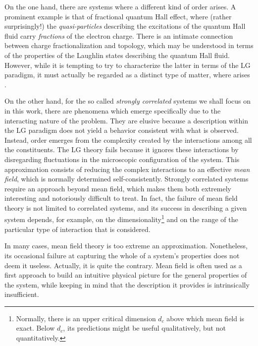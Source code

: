 On the one hand, there are systems where a different kind of order arises.
A prominent example is that of fractional quantum Hall effect, where (rather surprisingly!) the \emph{quasi-particles} describing the excitations of the quantum Hall fluid carry \emph{fractions} of the electron charge.
There is an intimate connection between charge fractionalization and topology, which may be understood in terms of the properties of the Laughlin states describing the quantum Hall fluid. However, while it is tempting to try to characterize the latter in terms of the \acs{LG} paradigm, it must actually be regarded as a distinct type of matter, where  arises \cite{wen_topological_1990}.

On the other hand, for the so called \emph{strongly correlated} systems we shall focus on in this work, there are phenomena which emerge specifically due to the interacting nature of the problem.
They are elusive because a description within the \acs{LG} paradigm does not yield a behavior consistent with what is observed.
Instead, order emerges from the complexity created by the interactions among all the constituents.
The \acs{LG} theory fails because it ignores these interactions by disregarding fluctuations in the microscopic configuration of the system.
This approximation consists of reducing the complex interactions to an effective \emph{mean field}, which is normally determined self-consistently.
Strongly correlated systems require an approach beyond mean field, which makes them both extremely interesting and notoriously difficult to treat.
In fact, the failure of mean field theory is not limited to correlated systems, and its success in describing a given system depends, for example, on the dimensionality\footnote{Normally, there is an upper critical dimension $d_c$ above which mean field is exact. Below $d_c$, its predictions might be useful qualitatively, but not quantitatively.} and on the range of the particular type of interaction that is considered.

In many cases, mean field theory is too extreme an approximation.
Nonetheless, its occasional failure at capturing the whole of a system's properties does not deem it  useless.
Actually, it is quite the contrary.
Mean field is often used as a first approach to build an intuitive physical picture for the general properties of the system, while keeping in mind that the description it provides is intrinsically insufficient.

